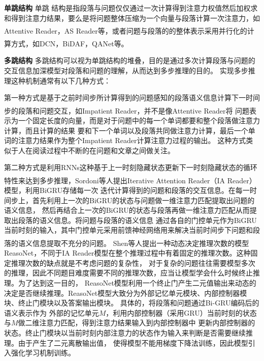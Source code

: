 \documentclass{article}
\newcommand{\upcite}[1]{\textsuperscript{\textsuperscript{\cite{#1}}}}
\begin{document}
\noindent \textbf{单跳结构} \quad 单跳
结构是指段落与问题仅仅通过一次计算得到注意力权值然后加权求和得到注意力结果，要么是将问题整体压缩为一个向量与段落计算一次注意力，如Attentive Reader\upcite{Hermann}，AS Reader\upcite{ASR}等，或者问题与段落的的整体表示采用并行化的计算方式，如DCN\upcite{DCN}，BiDAF\upcite{BiDAF}，QANet\upcite{QANet}等。
\vspace{1ex}

\noindent \textbf{多跳结构} \quad 多跳结构可以视为单跳结构的堆叠，目的是通过多次计算段落与问题的交互信息加深模型对段落和问题的理解，从而达到多步推理的目的。
实现多步推理这种机制通常有以下几种方式：
\vspace{1ex}

\noindent 第一种方式是基于之前时间步所计算得到的问题感知的段落语义信息计算下一时间步的段落和问题交互，如Impatient Reader\upcite{Hermann}，并不是像Attentive Reader将
	问题表示为一个固定长度的向量，而是对于问题中的每一个单词都要和整个段落做注意力计算，而且计算的结果
	要和下一个单词以及段落共同做注意力计算，最后一个单词的注意力结果作为整个Impatient Reader计算注意力过程的输出。
	这种方式类似于人在阅读过程中不断的在问题和文章之间做关注。
\vspace{1ex}

\noindent
第二种方式是利用RNNs这种基于上一时刻隐藏状态更新下一时刻隐藏状态的循环特性来达到多步推理，Sordoni等人\upcite{IAReader}提出Iterative Attention Reader（IA Reader）模型，利用BiGRU存储每一次
迭代计算得到的问题和段落的交互信息。在每一时间步上，首先利用上一次的BiGRU的状态与问题做一维注意力匹配提取出问题的语义信息，
然后再结合上一次的BiGRU的状态与段落再做一维注意力匹配从而提取出段落的语义信息。将问题与段落的语义信息
通过各自的门控单元作为BiGRU当前时刻的输入，其中门控单元采用前馈神经网络用来解决当前时间步下问题和段落的语义信息提取不充分的问题。
Shen等人\upcite{Reasonet}提出一种动态决定推理次数的模型ReasoNet，不同于IA Reader模型在整个推理过程中有着固定的推理次数。这种固定推理次数的缺点就是不考虑问题的复杂性，
对于复杂的问题往往需要模型多次的推理，因此不同题目难度需要不同的推理次数，应当让模型学会什么时候终止推理。为了达到这一目的，
ReasoNet模型利用一个终止门产生二元值输出来动态的决定是否继续推理。ReasoNet模型大致分为外部记忆单元模块、内部控制器模块、终止门模块以及答案输出模块。
具体的，将段落和问题通过Bi-GRU编码后的语义表示作为
外部的记忆单元$M$，利用内部控制器（采用GRU）当前时刻的状态与$M$做二维注意力匹配，得到注意力结果输入到内部控制器中
更新内部控制器的状态。终止门模块以当前时刻内部注意力的状态作为输入来判断是否需要继续推理。由于产生了二元离散输出值，
使得模型不能用梯度下降法训练，因此模型引入强化学习机制训练。
\vspace{1ex}
%
\end{document}
